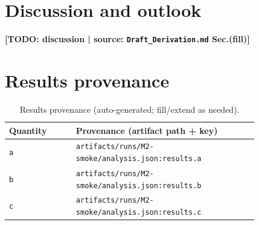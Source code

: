 \documentclass[aps,prd,preprint,12pt]{revtex4-2}
\begin{document}
\section{Discussion and outlook}
\textbf{[TODO: discussion | source: \texttt{Draft\_Derivation.md} Sec.(fill)]}

\appendix

\section{Results provenance}
\begin{table}[h]
\centering
\begin{tabular}{p{0.22\linewidth} p{0.60\linewidth}}
\hline
Quantity & Provenance (artifact path + key) \\
\hline
\texttt{a} & \texttt{artifacts/runs/M2-smoke/analysis.json:results.a} \\
\texttt{b} & \texttt{artifacts/runs/M2-smoke/analysis.json:results.b} \\
\texttt{c} & \texttt{artifacts/runs/M2-smoke/analysis.json:results.c} \\
\hline
\end{tabular}
\caption{Results provenance (auto-generated; fill/extend as needed).}
\end{table}



\end{document}

